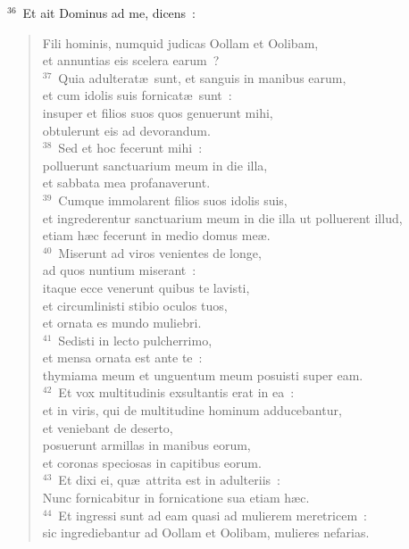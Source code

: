 ${}^{36}$~Et ait Dominus ad me, dicens~: \begin{flushleft}\begin{verse}Fili hominis, numquid judicas Oollam et Oolibam,\\ et annuntias eis scelera earum~?\\
${}^{37}$~Quia adulterat\ae\ sunt, et sanguis in manibus earum,\\ et cum idolis suis fornicat\ae\ sunt~:\\ insuper et filios suos quos genuerunt mihi,\\ obtulerunt eis ad devorandum.\\
${}^{38}$~Sed et hoc fecerunt mihi~:\\ polluerunt sanctuarium meum in die illa,\\ et sabbata mea profanaverunt.\\
${}^{39}$~Cumque immolarent filios suos idolis suis,\\ et ingrederentur sanctuarium meum in die illa ut polluerent illud,\\ etiam h\ae c fecerunt in medio domus me\ae .\\
${}^{40}$~Miserunt ad viros venientes de longe,\\ ad quos nuntium miserant~:\\ itaque ecce venerunt quibus te lavisti,\\ et circumlinisti stibio oculos tuos,\\ et ornata es mundo muliebri.\\
${}^{41}$~Sedisti in lecto pulcherrimo,\\ et mensa ornata est ante te~:\\ thymiama meum et unguentum meum posuisti super eam.\\
${}^{42}$~Et vox multitudinis exsultantis erat in ea~:\\ et in viris, qui de multitudine hominum adducebantur,\\ et veniebant de deserto,\\ posuerunt armillas in manibus eorum,\\ et coronas speciosas in capitibus eorum.\\
${}^{43}$~Et dixi ei, qu\ae\ attrita est in adulteriis~:\\ Nunc fornicabitur in fornicatione sua etiam h\ae c.\\
${}^{44}$~Et ingressi sunt ad eam quasi ad mulierem meretricem~:\\ sic ingrediebantur ad Oollam et Oolibam, mulieres nefarias.\\

\end{verse}
\end{flushleft}
